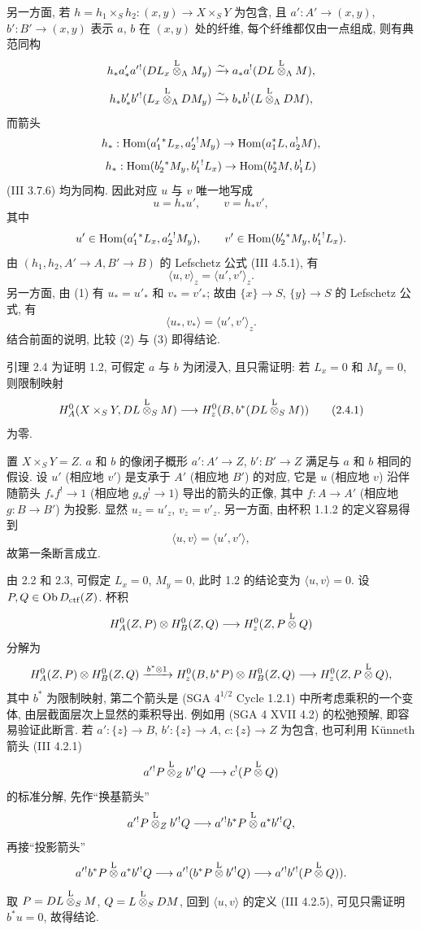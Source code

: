 另一方面, 若 $h=h_1\times_Sh_2:(x,y)\to X\times_SY$ 为包含, 且 $a':A'\to(x,y)$, $b':B'\to(x,y)$ 表示 $a$, $b$ 在 $(x,y)$ 处的纤维, 每个纤维都仅由一点组成, 则有典范同构
\[
h_*a'_*a'{}^!(DL_x\overset{\mathrm L}{\otimes}_{\Lambda}M_y)
 \xrightarrow{\sim} a_*a^!(DL\overset{\mathrm L}{\otimes}_{\Lambda}M),
\]
\[
h_*b'_*b'{}^!(L_x\overset{\mathrm L}{\otimes}_{\Lambda}DM_y)
 \xrightarrow{\sim} b_*b^!(L\overset{\mathrm L}{\otimes}_{\Lambda}DM),
\]
而箭头
\[
h_*:\operatorname{Hom}(a_1'{}^*L_x,a_2'{}^!M_y)\to \operatorname{Hom}(a_1^*L,a_2^!M),
\]
\[
h_*:\operatorname{Hom}(b_2'{}^*M_y,b_1'{}^!L_x)\to \operatorname{Hom}(b_2^*M,b_1^!L)
\]
(III 3.7.6) 均为同构. 因此对应 $u$ 与 $v$ 唯一地写成
\begin{equation}\tag{1}
u=h_*u',\qquad v=h_*v',
\end{equation}
其中
\[
u'\in\operatorname{Hom}(a_1'{}^*L_x,a_2'{}^!M_y),\qquad
v'\in\operatorname{Hom}(b_2'{}^*M_y,b_1'{}^!L_x).
\]
由 $(h_1,h_2,A'\to A,B'\to B)$ 的 Lefschetz 公式 (III 4.5.1), 有
\begin{equation}\tag{2}
\langle u,v\rangle_z=\langle u',v'\rangle_z .
\end{equation}
另一方面, 由 (1) 有 $u_*=u'_*$ 和 $v_*=v'_*$; 故由 $\{x\}\to S$, $\{y\}\to S$ 的 Lefschetz 公式, 有
\begin{equation}\tag{3}
\langle u_*,v_*\rangle=\langle u',v'\rangle_z .
\end{equation}
结合前面的说明, 比较 (2) 与 (3) 即得结论.

\begin{statement}{引理 2.4}
为证明 1.2, 可假定 $a$ 与 $b$ 为闭浸入, 且只需证明: 若 $L_x=0$ 和 $M_y=0$, 则限制映射
\begin{equation}
H_A^0(X\times_SY,DL\overset{\mathrm L}{\otimes}_SM)
 \longrightarrow H_z^0(B,b^*(DL\overset{\mathrm L}{\otimes}_SM))
\tag{2.4.1}
\end{equation}
为零.
\end{statement}

置 $X\times_SY=Z$. $a$ 和 $b$ 的像闭子概形 $a':A'\to Z$, $b':B'\to Z$ 满足与 $a$ 和 $b$ 相同的假设. 设 $u'$ (相应地 $v'$) 是支承于 $A'$ (相应地 $B'$) 的对应, 它是 $u$ (相应地 $v$) 沿伴随箭头 $f_*f^!\to1$ (相应地 $g_*g^!\to1$) 导出的箭头的正像, 其中 $f:A\to A'$ (相应地 $g:B\to B'$) 为投影. 显然 $u_z=u'_z$, $v_z=v'_z$. 另一方面, 由杯积 1.1.2 的定义容易得到
\[
\langle u,v\rangle=\langle u',v'\rangle,
\]
故第一条断言成立.

由 2.2 和 2.3, 可假定 $L_x=0$, $M_y=0$, 此时 1.2 的结论变为 $\langle u,v\rangle=0$. 设 $P,Q\in\operatorname{Ob} D_{\mathrm{ctf}}(Z)$. 杯积
\[
H_A^0(Z,P)\otimes H_B^0(Z,Q)\longrightarrow H_z^0(Z,P\overset{\mathrm L}{\otimes} Q)
\]
分解为
\[
H_A^0(Z,P)\otimes H_B^0(Z,Q)
 \xrightarrow{\,b^*\otimes 1\,}
H_z^0(B,b^*P)\otimes H_B^0(Z,Q)
 \longrightarrow H_z^0(Z,P\overset{\mathrm L}{\otimes} Q),
\]
其中 $b^*$ 为限制映射, 第二个箭头是 (SGA $4^{1/2}$ Cycle 1.2.1) 中所考虑乘积的一个变体, 由层截面层次上显然的乘积导出. 例如用 (SGA 4 XVII 4.2) 的松弛预解, 即容易验证此断言. 若 $a':\{z\}\to B$, $b':\{z\}\to A$, $c:\{z\}\to Z$ 为包含, 也可利用 Künneth 箭头 (III 4.2.1)
\[
a'{}^!P\overset{\mathrm L}{\otimes}_Z b'{}^!Q\longrightarrow c^!(P\overset{\mathrm L}{\otimes} Q)
\]
的标准分解, 先作``换基箭头''
\[
a'{}^!P\overset{\mathrm L}{\otimes}_Z b'{}^!Q\longrightarrow a'{}^!b^*P\overset{\mathrm L}{\otimes} a^*b'{}^!Q,
\]
再接``投影箭头''
\[
a'{}^!b^*P\overset{\mathrm L}{\otimes} a^*b'{}^!Q
 \longrightarrow a'{}^!(b^*P\overset{\mathrm L}{\otimes} b'{}^!Q)
 \longrightarrow a'{}^!b'{}^!(P\overset{\mathrm L}{\otimes} Q)).
\]
取 $P=DL\overset{\mathrm L}{\otimes}_SM$, $Q=L\overset{\mathrm L}{\otimes}_SDM$, 回到 $\langle u,v\rangle$ 的定义 (III 4.2.5), 可见只需证明 $b^*u=0$, 故得结论.

